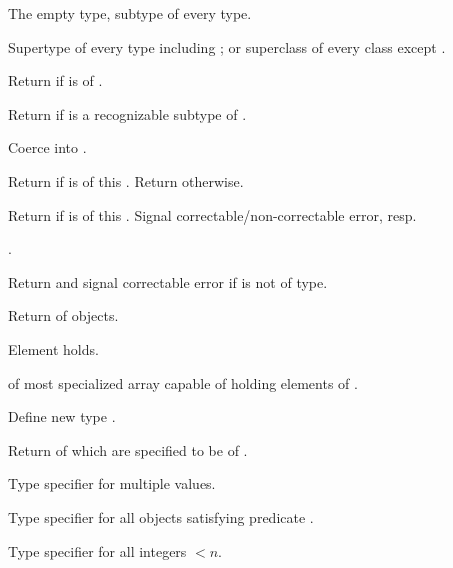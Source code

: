 \begin{LIST}{1cm}

  The empty type, subtype of every type.

  Supertype of every type including ; or superclass of every
  class except .

  Return \retval{\T} if  is of .

  Return \retval{\T} if  is a recognizable subtype of
  . 

  Coerce  into .

  Return  if  is of this
  . Return  otherwise. 

  Return  if  is of this .
  Signal correctable/non-correctable error, resp.

  .

   Return \retval{\NIL} and signal
  correctable error if  is not of {type}. 

  Return  of  objects.

  Element   holds.

   of most specialized array capable of holding
  elements of . 

  Define new type .

  Return  of  which are specified to be of
  . 

  Type specifier for multiple values.

   Type specifier for all
  objects satisfying predicate .

   Type specifier for all integers $<n$.

  \end{LIST}



